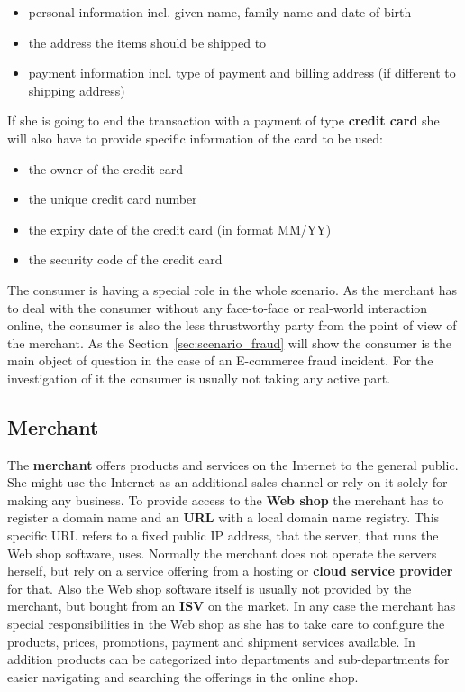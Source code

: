 \begin{itemize}
		\item personal information incl. given name, family name and date of birth
		\item the address the items should be shipped to
		\item payment information incl. type of payment and billing address (if different to shipping address)
\end{itemize}

If she is going to end the transaction with a payment of type \textbf{credit card} she will also have to provide specific information of the card to be used:\@

\begin{itemize}
		\item the owner of the credit card
		\item the unique credit card number
		\item the expiry date of the credit card (in format MM/YY)
		\item the security code of the credit card
\end{itemize}

The consumer is having a special role in the whole scenario. As the merchant has to deal with the consumer without any face-to-face or real-world interaction online, the consumer is also the less thrustworthy party from the point of view of the merchant. As the Section~\ref{sec:scenario_fraud} will show the consumer is the main object of question in the case of an E-commerce fraud incident. For the investigation of it the consumer is usually not taking any active part.


\subsection{Merchant}
\label{subsec:stakeholder_merchant}

The \textbf{merchant} offers products and services on the Internet to the general public. She might use the Internet as an additional sales channel or rely on it solely for making any business. To provide access to the \textbf{Web shop} the merchant has to register a domain name and an \textbf{\gls{URL}} with a local domain name registry. This specific \gls{URL} refers to a fixed public \gls{IP} address, that the server, that runs the Web shop software, uses. Normally the merchant does not operate the servers herself, but rely on a service offering from a hosting or \textbf{cloud service provider} for that. Also the Web shop software itself is usually not provided by the merchant, but bought from an \textbf{\gls{ISV}} on the market. In any case the merchant has special responsibilities in the Web shop as she has to take care to configure the products, prices, promotions, payment and shipment services available. In addition products can be categorized into departments and sub-departments for easier navigating and searching the offerings in the online shop. \\

